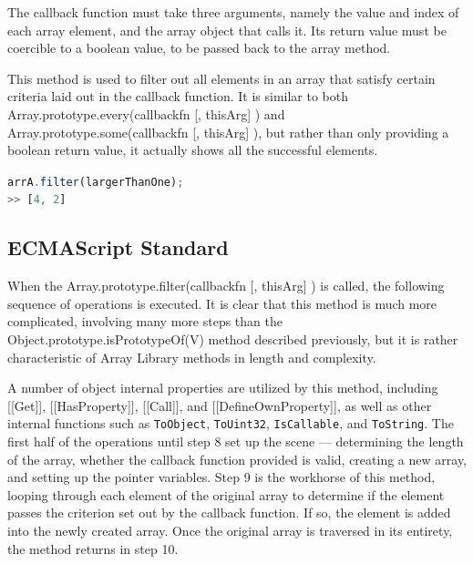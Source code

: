 \documentclass[a4paper,11pt,twoside]{report}
\def\jsinline{\lstinline[language=JavaScript, basicstyle=\small]}%\end{lstlisting}
\begin{document}
The callback function must take three arguments, namely the value and index of each array element, and the array object that calls it. Its return value must be coercible to a boolean value, to be passed back to the array method.

This method is used to filter out all elements in an array that satisfy certain criteria laid out in the callback function. It is similar to both Array.prototype.every(callbackfn [, thisArg] ) and Array.prototype.some(callbackfn [, thisArg] ), but rather than only providing a boolean return value, it actually shows all the successful elements.

\jsinline|arrA.filter(largerThanOne);|\\
\jsinline|>> [4, 2]|

\subsection{ECMAScript Standard}
When the Array.prototype.filter(callbackfn [, thisArg] ) is called, the following sequence of operations is executed. It is clear that this method is much more complicated, involving many more steps than the Object.prototype.isPrototypeOf(V) method described previously, but it is rather characteristic of Array Library methods in length and complexity.

A number of object internal properties are utilized by this method, including [[Get]], [[HasProperty]], [[Call]], and [[DefineOwnProperty]], as well as other internal functions such as \texttt{ToObject}, \texttt{ToUint32}, \texttt{IsCallable}, and \texttt{ToString}. The first half of the operations until step 8 set up the scene --- determining the length of the array, whether the callback function provided is valid, creating a new array, and setting up the pointer variables. Step 9 is the workhorse of this method, looping through each element of the original array to determine if the element passes the criterion set out by the callback function. If so, the element is added into the newly created array. Once the original array is traversed in its entirety, the method returns in step 10.
\end{document}
